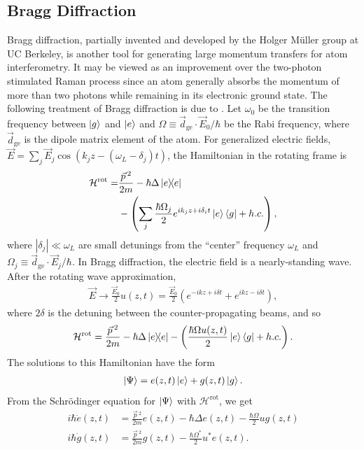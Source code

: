\documentclass[reprint,
nofootinbib,
amsmath,amssymb,
aps]{revtex4-1}
\newcommand{\f}[2]{\frac{#1}{#2}}
\newcommand{\lp}{\left(}
\newcommand{\rp}{\right)}
\begin{document}
\subsection{Bragg Diffraction}\label{sect:BD}


Bragg diffraction, partially invented and developed by the Holger M\"{u}ller group at UC Berkeley, is another tool for generating large momentum transfers for atom interferometry. It may be viewed as an improvement over the two-photon stimulated Raman process since an atom generally absorbs the momentum of more than two photons while remaining in its electronic ground state.  The following treatment of Bragg diffraction is due to \cite{estey2016precision}. Let $\omega_0$ be the transition frequency between $\ket{g}$ and $\ket{e}$ and $\Omega \equiv \vec{d}_\text{ge}\cdot \vec{E}_0/\hbar$ be the Rabi frequency, where $\vec{d}_\text{ge}$ is the dipole matrix element of the atom. For generalized electric fields, $\vec{E} = \sum_j \vec{E}_j \cos(k_j z - (\omega_L - \delta_j)t)$, the Hamiltonian in the rotating frame is
\begin{align*}
\mathcal{H}^\text{rot} = &\f{\vec{p}\,^2}{2m} - \hbar \Delta \ketbra{e} \\
&- \lp \sum_j \f{\hbar \Omega_j}{2} e^{ik_jz + i \delta_i t} \ket{e}\bra{g} + h.c. \rp,
\end{align*}
where $|\delta_j|\ll \omega_L$ are small detunings from the ``center'' frequency $\omega_L$ and $\Omega_j \equiv \vec{d}_\text{ge}\cdot \vec{E}_j / \hbar$. In Bragg diffraction, the electric field is a nearly-standing wave. After the rotating wave approximation, 
\begin{align*}
\vec{E} \to \f{\vec{E}_0}{2}u(z,t) = \f{\vec{E}_0}{2} \lp  e^{-ikz + i\delta t} + e^{ikz-i\delta t}\rp,
\end{align*}
where $2\delta$ is the detuning between the counter-propagating beams, and so
\begin{align*}
\mathcal{H}^\text{rot} = \f{\vec{p}\,^2}{2m} -\hbar \Delta  \ketbra{e} -\lp \f{\hbar\Omega u(z,t)}{2}\ket{e}\bra{g} + h.c.\rp.
\end{align*}
The solutions to this Hamiltonian have the form 
\begin{align*}
\ket{\Psi} = e(z,t)\ket{e} + g(z,t)\ket{g}.
\end{align*} 
From the Schr\"{o}dinger equation for $\ket{\Psi}$ with $\mathcal{H}^\text{rot}$, we get
\begin{align}
i\hbar \dot{e}(z,t) &= \f{\vec{p}\,^2}{2m} e(z,t) - \hbar \Delta e(z,t) - \f{\hbar\Omega}{2}ug(z,t)\label{eq:2}\\
i\hbar \dot{g}(z,t) &= \f{\vec{p}\,^2}{2m} g(z,t) - \f{\hbar\Omega^*}{2}u^*e(z,t)\label{eq:3}.
\end{align}
\end{document}
